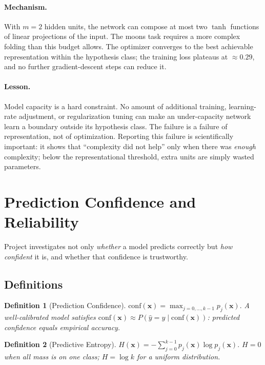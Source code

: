 \documentclass[11pt]{article}
\newcommand{\bx}{\mathbf{x}}
\newtheorem{definition}{Definition}
\begin{document}
\paragraph{Mechanism.}
With $m=2$ hidden units, the network can compose at most two $\tanh$ functions
of linear projections of the input.
The moons task requires a more complex folding than this budget allows.
The optimizer converges to the best achievable representation within the
hypothesis class; the training loss plateaus at $\approx0.29$, and no further
gradient-descent steps can reduce it.

\paragraph{Lesson.}
Model capacity is a hard constraint.
No amount of additional training, learning-rate adjustment, or regularization
tuning can make an under-capacity network learn a boundary outside its
hypothesis class.
The failure is a failure of representation, not of optimization.
Reporting this failure is scientifically important: it shows that
``complexity did not help'' only when there was \emph{enough} complexity;
below the representational threshold, extra units are simply wasted parameters.

\section{Prediction Confidence and Reliability}
\label{sec:track_b}

Project investigates not only \emph{whether} a model predicts correctly but
\emph{how confident} it is, and whether that confidence is trustworthy.

\subsection{Definitions}

\begin{definition}[Prediction Confidence]
$\mathrm{conf}(\bx)=\max_{j=0,\ldots,k-1}p_j(\bx).$
A well-calibrated model satisfies
$\mathrm{conf}(\bx)\approx P(\hat{y}=y\mid\mathrm{conf}(\bx))$:
predicted confidence equals empirical accuracy.
\end{definition}

\begin{definition}[Predictive Entropy]
$H(\bx)=-\sum_{j=0}^{k-1}p_j(\bx)\log p_j(\bx).$
$H=0$ when all mass is on one class; $H=\log k$ for a uniform distribution.
\end{definition}
\end{document}
